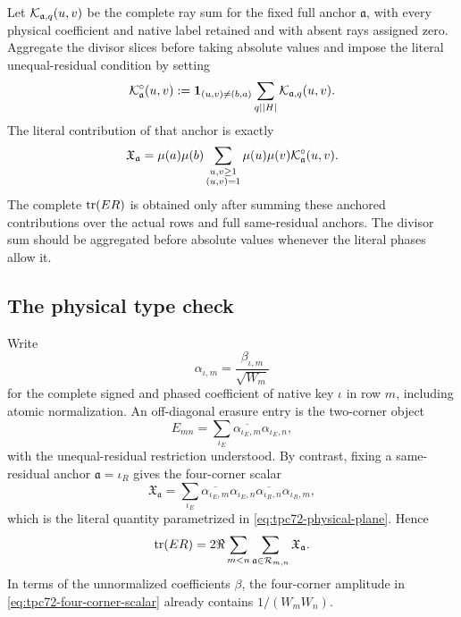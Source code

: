 Let \(\mathcal K_{\mathfrak a,q}(u,v)\) be the complete ray sum for the fixed full
anchor \(\mathfrak a\), with every physical
coefficient and native label retained and with absent rays assigned zero.
Aggregate the divisor slices before taking absolute values and impose the
literal unequal-residual condition by setting
\begin{equation}
 \mathcal K_{\mathfrak a}^{\circ}(u,v)
 :=
 \mathbf 1_{(u,v)\ne(b,a)}
 \sum_{q\mid |H|}\mathcal K_{\mathfrak a,q}(u,v).
 \label{eq:tpc72-aggregate-erasure-kernel}
\end{equation}
The literal contribution of that anchor is exactly
\begin{equation}
 \mathfrak X_{\mathfrak a}
 =
 \mu(a)\mu(b)
 \sum_{\substack{u,v\ge1\\(u,v)=1}}
 \mu(u)\mu(v)\mathcal K_{\mathfrak a}^{\circ}(u,v).
 \label{eq:tpc72-physical-plane}
\end{equation}
The complete \(\operatorname{tr}(ER)\) is obtained only after summing these anchored
contributions over the actual rows and full same-residual anchors.
The divisor sum should be aggregated before absolute values whenever the
literal phases allow it.

\subsection{The physical type check}

Write
\[
 \alpha_{\iota,m}
 =
 \frac{\beta_{\iota,m}}{\sqrt{W_m}}
\]
for the complete signed and phased coefficient of native key \(\iota\) in
row \(m\), including atomic normalization.  An off-diagonal erasure entry
is the two-corner object
\begin{equation}
 E_{mn}
 =
 \sum_{\iota_E}
 \overline{\alpha_{\iota_E,m}}\alpha_{\iota_E,n},
 \label{eq:tpc72-two-corner-entry}
\end{equation}
with the unequal-residual restriction understood.  By contrast, fixing a
same-residual anchor \(\mathfrak a=\iota_R\) gives the four-corner scalar
\begin{equation}
 \mathfrak X_{\mathfrak a}
 =
 \sum_{\iota_E}
 \overline{\alpha_{\iota_E,m}}\alpha_{\iota_E,n}
 \overline{\alpha_{\iota_R,n}}\alpha_{\iota_R,m},
 \label{eq:tpc72-four-corner-scalar}
\end{equation}
which is the literal quantity parametrized in
\eqref{eq:tpc72-physical-plane}.  Hence
\begin{equation}
 \operatorname{tr}(ER)
 =
 2\Re
 \sum_{m<n}
 \sum_{\mathfrak a\in\mathcal R_{m,n}}
 \mathfrak X_{\mathfrak a}.
 \label{eq:tpc72-anchored-trace}
\end{equation}
In terms of the unnormalized coefficients \(\beta\), the four-corner
amplitude in \eqref{eq:tpc72-four-corner-scalar} already contains
\(1/(W_mW_n)\).

